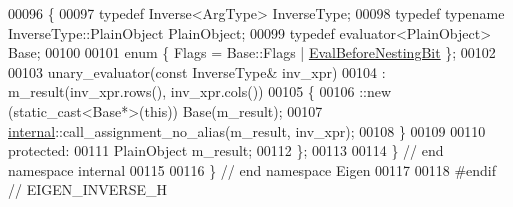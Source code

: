 \begin{DoxyCode}
00096 \{
00097   \textcolor{keyword}{typedef} Inverse<ArgType> InverseType;
00098   \textcolor{keyword}{typedef} \textcolor{keyword}{typename} InverseType::PlainObject PlainObject;
00099   \textcolor{keyword}{typedef} evaluator<PlainObject> Base;
00100   
00101   \textcolor{keyword}{enum} \{ Flags = Base::Flags | \hyperlink{group__flags_gaa34e83bae46a8eeae4e69ebe3aaecbed}{EvalBeforeNestingBit} \};
00102 
00103   unary\_evaluator(\textcolor{keyword}{const} InverseType& inv\_xpr)
00104     : m\_result(inv\_xpr.rows(), inv\_xpr.cols())
00105   \{
00106     ::new (static\_cast<Base*>(\textcolor{keyword}{this})) Base(m\_result);
00107     \hyperlink{namespaceinternal}{internal}::call\_assignment\_no\_alias(m\_result, inv\_xpr);
00108   \}
00109   
00110 protected:
00111   PlainObject m\_result;
00112 \};
00113   
00114 \} \textcolor{comment}{// end namespace internal}
00115 
00116 \} \textcolor{comment}{// end namespace Eigen}
00117 
00118 \textcolor{preprocessor}{#endif // EIGEN\_INVERSE\_H}
\end{DoxyCode}

